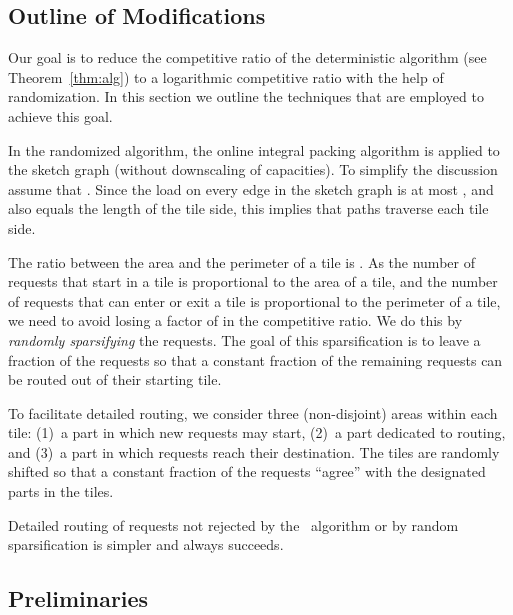 \documentclass[11pt]{article}
\newcommand{\route}{\text{\sc{ipp}}}
\newcommand{\IPP}{\route}
\newenvironment{proof sketch}[1]{\noindent {\emph{Proof sketch of #1:}}}{\hfill \qed}
\begin{document}
\subsection{Outline of Modifications}\label{sec:comparison}
Our goal is to reduce the   competitive ratio of the deterministic algorithm (see
Theorem~\ref{thm:alg}) to a logarithmic competitive ratio with
the help of randomization.  In this section we outline the techniques that are
employed to achieve this goal.

In the randomized algorithm, the online integral packing algorithm is
applied to the sketch graph (without downscaling of capacities). To
simplify the discussion assume that .  Since the load on every
edge in the sketch graph is at most , and  also equals the length of
the tile side, this implies that  paths traverse each tile side.

The ratio between the area and the perimeter of a tile is .
As the number of requests that start in a tile is proportional to the
area of a tile, and the number of requests that can enter or exit a tile
is proportional to the perimeter of a tile, we need to avoid losing a
factor of  in the competitive ratio. We do this by
\emph{randomly sparsifying} the requests. The goal of this
sparsification is to leave a  fraction of the requests so
that a constant fraction of the remaining requests can be routed out
of their starting tile.

To facilitate detailed routing, we consider three (non-disjoint) areas within each
tile: (1)~a part in which new requests may start, (2)~a part dedicated to routing,
and (3)~a part in which requests reach their destination.  The tiles are randomly
shifted so that a constant fraction of the requests ``agree'' with the designated
parts in the tiles.

Detailed routing of requests not rejected by the \IPP\
algorithm or by random sparsification is simpler and always
succeeds.

\subsection{Preliminaries}\label{sect:prelimline}


\begin{comment}
\begin{figure}\centering
\texttt{[image: sketchuntilt.eps]}
\caption{
Tiling of the untilted space-time graph  by rectangles. Only the shaded tiles are nodes of the sketch graph. Note that if the SW-quadrant of a tile does not contain nodes from , then this tile is removed.
The sketch graph over the tiles is depicted by the black circles and the incident directed edges.}
\label{fig:sketch}
\end{figure}
\end{comment}
\end{document}
